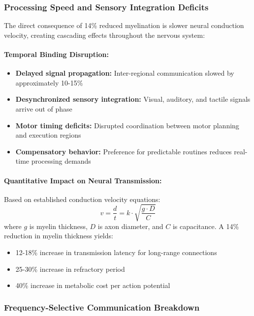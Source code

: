 \documentclass[11pt]{article}
\let\oldsubsubsection\subsubsection
\renewcommand{\subsubsection}[1]{\oldsubsubsection{#1}\setlength{\leftskip}{1.5em}}
\begin{document}
\subsubsection{Processing Speed and Sensory Integration Deficits}

The direct consequence of 14\% reduced myelination is slower neural conduction velocity, creating cascading effects throughout the nervous system:

\paragraph{Temporal Binding Disruption:}
\begin{itemize}
\item \textbf{Delayed signal propagation:} Inter-regional communication slowed by approximately 10-15\%
\item \textbf{Desynchronized sensory integration:} Visual, auditory, and tactile signals arrive out of phase
\item \textbf{Motor timing deficits:} Disrupted coordination between motor planning and execution regions
\item \textbf{Compensatory behavior:} Preference for predictable routines reduces real-time processing demands
\end{itemize}

\paragraph{Quantitative Impact on Neural Transmission:}
Based on established conduction velocity equations:
\begin{equation}
v = \frac{d}{t} = k \cdot \sqrt{\frac{g \cdot D}{C}}
\end{equation}
where $g$ is myelin thickness, $D$ is axon diameter, and $C$ is capacitance. A 14\% reduction in myelin thickness yields:
\begin{itemize}
\item 12-18\% increase in transmission latency for long-range connections
\item 25-30\% increase in refractory period
\item 40\% increase in metabolic cost per action potential
\end{itemize}

\subsubsection{Frequency-Selective Communication Breakdown}
\end{document}
